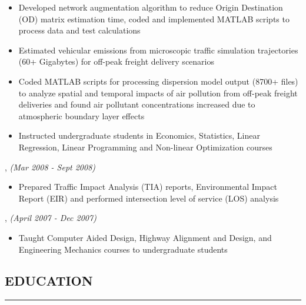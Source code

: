 \documentclass[10pt,a4]{article}
\def\mydot{\textcolor{deep_blue}{\rule{0.75ex}{0.75ex}}}
\begin{document}
\begin{small}
\begin{itemize}
\item[\mydot] Developed network augmentation algorithm to reduce Origin Destination (OD) matrix estimation time, coded and implemented MATLAB scripts to process data and test calculations

\item[\mydot] Estimated vehicular emissions from microscopic traffic simulation trajectories (60+ Gigabytes) for off-peak freight delivery scenarios

\item[\mydot] Coded MATLAB scripts for processing dispersion model output (8700+ files) to analyze spatial and temporal impacts of air pollution from off-peak freight deliveries and found air pollutant concentrations increased due to atmospheric boundary layer effects

\item[\mydot] Instructed undergraduate students in Economics, Statistics, Linear Regression, Linear Programming and Non-linear Optimization courses

\end{itemize}

, {\em \color{drkgray}(Mar 2008 - Sept 2008)}
\begin{itemize}
\item[\mydot] Prepared Traffic Impact Analysis (TIA) reports, Environmental Impact Report (EIR) and performed intersection level of service (LOS) analysis
\end{itemize}

, {\em \color{drkgray}(April 2007 - Dec 2007)}
\begin{itemize}
\item[\mydot] Taught Computer Aided Design, Highway Alignment and Design, and Engineering Mechanics courses to undergraduate students
\end{itemize}



\vspace{-0.55cm}
\subsection*{\color{dark_blue}EDUCATION}
\vspace{-0.15cm}
\hrule
\vspace{0.1cm}


\end{small}
\end{document}
